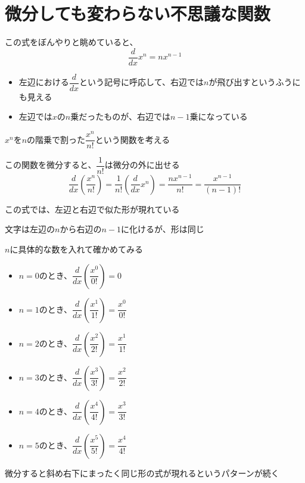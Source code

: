\documentclass[../book_jiriki_calc]{subfiles}
\begin{document}
\section{微分しても変わらない不思議な関数}

この式をぼんやりと眺めていると、
\begin{equation}
  \dfrac{d}{dx}x^n = nx^{n-1}
\end{equation}

\begin{itemize}
  \item 左辺における$\dfrac{d}{dx}$という記号に呼応して、右辺では$n$が飛び出すというふうにも見える
  \item 左辺では$x$の$n$乗だったものが、右辺では$n-1$乗になっている
\end{itemize}

\sectionline

$x^n$を$n$の階乗で割った$\dfrac{x^n}{n!}$という関数を考える

\br

この関数を微分すると、$\dfrac{1}{n!}$は微分の外に出せる
\begin{equation}
  \dfrac{d}{dx}\left(\dfrac{x^n}{n!}\right) = \dfrac{1}{n!}\left(\dfrac{d}{dx}x^n\right) = \dfrac{nx^{n-1}}{n!} = \dfrac{x^{n-1}}{(n-1)!}
\end{equation}

この式では、左辺と右辺で似た形が現れている

文字は左辺の$n$から右辺の$n-1$に化けるが、形は同じ

\br

$n$に具体的な数を入れて確かめてみる
\begin{itemize}
  \item $n=0$のとき、$\dfrac{d}{dx}\left(\dfrac{x^0}{0!}\right) = 0$
  \item $n=1$のとき、$\dfrac{d}{dx}\left(\dfrac{x^1}{1!}\right) = \dfrac{x^0}{0!}$
  \item $n=2$のとき、$\dfrac{d}{dx}\left(\dfrac{x^2}{2!}\right) = \dfrac{x^1}{1!}$
  \item $n=3$のとき、$\dfrac{d}{dx}\left(\dfrac{x^3}{3!}\right) = \dfrac{x^2}{2!}$
  \item $n=4$のとき、$\dfrac{d}{dx}\left(\dfrac{x^4}{4!}\right) = \dfrac{x^3}{3!}$
  \item $n=5$のとき、$\dfrac{d}{dx}\left(\dfrac{x^5}{5!}\right) = \dfrac{x^4}{4!}$
\end{itemize}
微分すると斜め右下にまったく同じ形の式が現れるというパターンが続く
\end{document}

